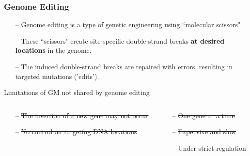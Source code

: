 \documentclass[xcolor=dvipsnames]{beamer}
\begin{document}
\begin{frame}
	\frametitle{Genome Editing}
	
	\begin{itemize}
		\item[--] Genome editing is a type of genetic engineering using ``molecular scissors"
		\item[--] These ``scissors" create site-specific double-strand breaks \textbf{at desired locations }in the genome. 
		\item[--] The induced double-strand breaks are repaired with errors, resulting in targeted mutations ('edits').
		
	\end{itemize} \pause
	\vspace{10pt}
	
	\large Limitations of GM not shared by genome editing
	\normalsize 
	\begin{columns}
		\begin{column}{0.5\textwidth}
			\begin{itemize}
				\item[--] \st{The insertion of a new gene may not occur} 
				\item[--] \st{No control on targeting DNA locations}
				
			\end{itemize}
		\end{column}
		\begin{column}{0.5\textwidth}
			\begin{itemize}
				\item[--] \st{One gene at a time}
				\item[--] \st{Expensive and slow}
				\item[--] Under strict regulation
			\end{itemize}
			
		\end{column}
	\end{columns}
\end{frame}
\end{document}
